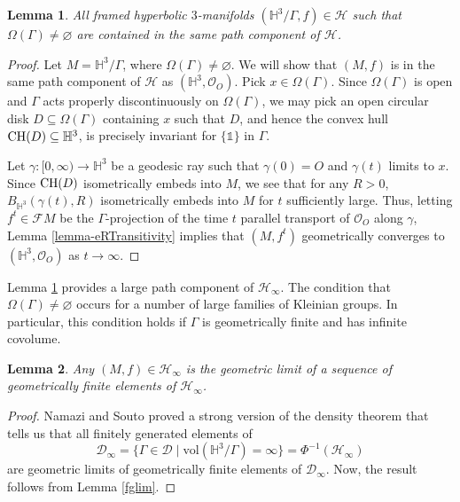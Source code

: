 \documentclass[11pt,leqno]{article}
\newtheorem{lemma}{Lemma}
\theoremstyle{introdef}
\numberwithin{lemma}{section}
\theoremstyle{definition}
\begin{document}
\begin{lemma}
\label{pathcomp}
    All framed hyperbolic $3$-manifolds $(\mathbb{H}^3/\Gamma,f)\in\mathcal{H}$ such that $\Omega(\Gamma)\neq\varnothing$ are contained in the same path component of $\mathcal{H}$.
\end{lemma}

\begin{proof}
    Let $M=\mathbb{H}^3/\Gamma$, where $\Omega(\Gamma)\neq\varnothing$. We will show that $(M,f)$ is in the same path component of $\mathcal{H}$ as $(\mathbb{H}^3,\mathcal{O}_O)$. Pick $x\in\Omega(\Gamma)$. Since $\Omega(\Gamma)$ is open and $\Gamma$ acts properly discontinuously on $\Omega(\Gamma)$, we may pick an open circular disk $D\subseteq\Omega(\Gamma)$ containing $x$ such that $D$, and hence the convex hull $\mathrm{CH}(D)\subseteq\mathbb{H}^3$, is precisely invariant for $\{\mathds{1}\}$ in $\Gamma$. \par 

    Let $\gamma:[0,\infty)\rightarrow\mathbb{H}^3$ be a geodesic ray such that $\gamma(0)=O$ and $\gamma(t)$ limits to $x$. Since $\mathrm{CH}(D)$ isometrically embeds into $M$, we see that for any $R>0$, $B_{\mathbb{H}^3}(\gamma(t),R)$ isometrically embeds into $M$ for $t$ sufficiently large. Thus, letting $f^t\in\mathcal{F}M$ be the $\Gamma$-projection of the time $t$ parallel transport of $\mathcal{O}_O$ along $\gamma$, Lemma \ref{lemma-eRTransitivity} implies that $(M,f^t)$ geometrically converges to $(\mathbb{H}^3,\mathcal{O}_O)$ as $t\rightarrow\infty$.
\end{proof}

Lemma \ref{pathcomp} provides a large path component of $\mathcal{H}_\infty$. The condition that $\Omega(\Gamma)\neq\varnothing$ occurs for a number of large families of Kleinian groups. In particular, this condition holds if $\Gamma$ is geometrically finite and has infinite covolume. \par


\begin{lemma}
\label{limofgeomfin}
    Any $(M,f)\in\mathcal{H}_\infty$ is the geometric limit of a sequence of geometrically finite elements of $\mathcal{H}_\infty$.
\end{lemma}
\begin{proof}
    Namazi and Souto \cite[Corollary 12.3]{NAM} proved a strong version of the density theorem that tells us that all finitely generated elements of \[\mathcal{D}_\infty=\{\Gamma\in\mathcal{D}\;|\;\mathrm{vol}(\mathbb{H}^3/\Gamma)=\infty\}=\Phi^{-1}(\mathcal{H}_\infty)\] are geometric limits of geometrically finite elements of $\mathcal{D}_\infty$. Now, the result follows from Lemma \ref{fglim}.
\end{proof}
\end{document}
